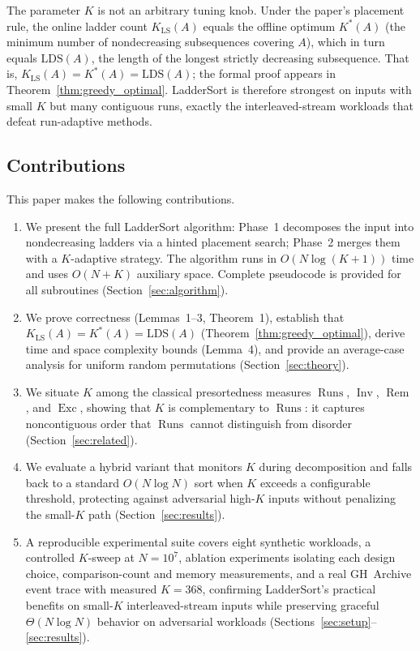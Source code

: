 \documentclass[12pt,a4paper]{article}
\theoremstyle{plain}
\theoremstyle{definition}
\DeclareMathOperator{\Runs}{Runs}
\DeclareMathOperator{\Inv}{Inv}
\DeclareMathOperator{\Rem}{Rem}
\DeclareMathOperator{\Exc}{Exc}
\begin{document}
The parameter $K$ is not an arbitrary tuning knob.  Under the paper's
placement rule, the online ladder count $K_{\mathrm{LS}}(A)$ equals the
offline optimum $K^*(A)$ (the minimum number of nondecreasing
subsequences covering $A$), which in turn equals $\mathrm{LDS}(A)$, the
length of the longest strictly decreasing subsequence.  That is,
$K_{\mathrm{LS}}(A) = K^*(A) = \mathrm{LDS}(A)$; the formal proof
appears in Theorem~\ref{thm:greedy_optimal}.  LadderSort is therefore
strongest on inputs with small $K$ but many contiguous runs, exactly the
interleaved-stream workloads that defeat run-adaptive methods.

\subsection{Contributions}
This paper makes the following contributions.

\begin{enumerate}
  \item We present the full LadderSort algorithm:
    Phase~1 decomposes the input into nondecreasing ladders via a
    hinted placement search; Phase~2 merges them with a $K$-adaptive
    strategy.  The algorithm runs in $O(N\log(K+1))$ time and
    uses $O(N+K)$ auxiliary space.  Complete pseudocode is provided for
    all subroutines (Section~\ref{sec:algorithm}).

  \item We prove correctness (Lemmas~1--3, Theorem~1),
    establish that $K_{\mathrm{LS}}(A) = K^*(A) = \mathrm{LDS}(A)$
    (Theorem~\ref{thm:greedy_optimal}), derive time and space complexity
    bounds (Lemma~4), and provide an average-case analysis for uniform
    random permutations (Section~\ref{sec:theory}).

  \item We situate $K$ among the
    classical presortedness measures $\Runs$, $\Inv$, $\Rem$, and $\Exc$,
    showing that $K$ is complementary to $\Runs$: it captures
    noncontiguous order that $\Runs$ cannot distinguish from disorder
    (Section~\ref{sec:related}).

  \item We evaluate a hybrid variant that
    monitors $K$ during decomposition and falls back to a standard
    $O(N\log N)$ sort when $K$ exceeds a configurable threshold,
    protecting against adversarial high-$K$ inputs without penalizing
    the small-$K$ path (Section~\ref{sec:results}).

  \item A reproducible experimental suite
    covers eight synthetic workloads, a controlled $K$-sweep at
    $N = 10^7$, ablation experiments isolating each design choice,
    comparison-count and memory measurements, and a real GH~Archive event
    trace with measured $K = 368$, confirming LadderSort's practical
    benefits on small-$K$ interleaved-stream inputs while preserving
    graceful $\Theta(N\log N)$ behavior on adversarial workloads
    (Sections~\ref{sec:setup}--\ref{sec:results}).
\end{enumerate}
\end{document}

